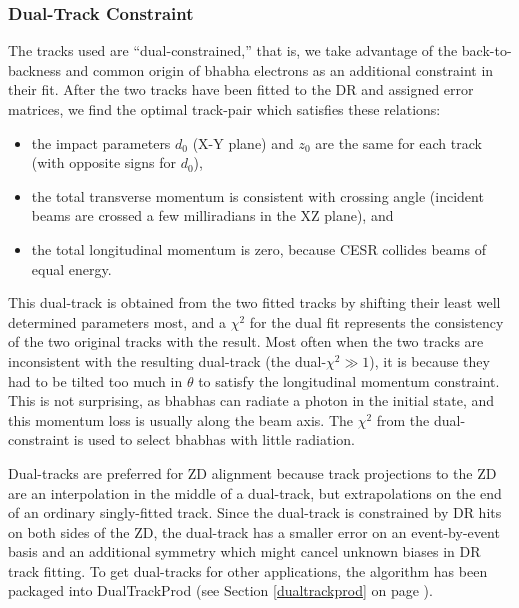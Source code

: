 \documentclass[12pt]{article}
\begin{document}
\subsubsection{Dual-Track Constraint}
\label{dualconstraint}

The tracks used are ``dual-constrained,'' that is, we take advantage
of the back-to-backness and common origin of bhabha electrons as an
additional constraint in their fit.  After the two tracks have been
fitted to the DR and assigned error matrices, we find the optimal
track-pair which satisfies these relations:
\begin{itemize}

  \item the impact parameters $d_0$ (X-Y plane) and $z_0$ are the same
  for each track (with opposite signs for $d_0$),

  \item the total transverse momentum is consistent with crossing
  angle (incident beams are crossed a few milliradians in the XZ
  plane), and

  \item the total longitudinal momentum is zero, because CESR collides
  beams of equal energy.

\end{itemize}
This dual-track is obtained from the two fitted tracks by shifting
their least well determined parameters most, and a $\chi^2$ for the
dual fit represents the consistency of the two original tracks with
the result.  Most often when the two tracks are inconsistent with the
resulting dual-track (the dual-$\chi^2 \gg 1$), it is because they had
to be tilted too much in $\theta$ to satisfy the longitudinal momentum
constraint.  This is not surprising, as bhabhas can radiate a photon
in the initial state, and this momentum loss is usually along the beam
axis.  The $\chi^2$ from the dual-constraint is used to select bhabhas
with little radiation.

Dual-tracks are preferred for ZD alignment because track projections
to the ZD are an interpolation in the middle of a dual-track, but
extrapolations on the end of an ordinary singly-fitted track.  Since
the dual-track is constrained by DR hits on both sides of the ZD, the
dual-track has a smaller error on an event-by-event basis and an
additional symmetry which might cancel unknown biases in DR track
fitting.  To get dual-tracks for other applications, the algorithm has
been packaged into DualTrackProd (see Section \ref{dualtrackprod} on
page \pageref{dualtrackprod}).
\end{document}
